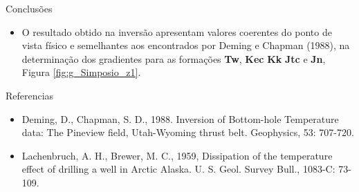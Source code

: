 \documentclass[final,t]{beamer}
\begin{document}
\begin{columns}[t]
\begin{column}{.31\linewidth}
\begin{block}{Conclusões}
	\begin{itemize}
\justifying	
		\item O resultado obtido na inversão apresentam valores coerentes do ponto de vista físico e semelhantes aos encontrados por Deming e Chapman (1988), na determinação dos gradientes para as formações \textbf{Tw}, \textbf{Kec} \textbf{Kk} \textbf{Jtc} e \textbf{Jn}, Figura \ref{fig:g_Simposio_z1}.
	
	\end{itemize}
	\vspace{-0.2cm}
\end{block}

\begin{block}{Referencias}

\begin{itemize}
\item Deming, D., Chapman, S. D., 1988. Inversion of Bottom-hole Temperature data: The Pineview field, Utah-Wyoming thrust belt. Geophysics, 53: 707-720.
\item Lachenbruch, A. H., Brewer, M. C., 1959, Dissipation of the temperature effect of drilling a well in Arctic Alaska. U. S. Geol. Survey Bull., 1083-C: 73-109.
\end{itemize}
\vspace{-0.2cm}
\end{block}

\end{column}

\end{columns}
\end{document}
